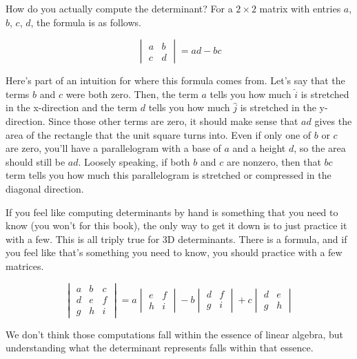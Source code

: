 How do you actually compute the determinant? For a $2 \times 2$ matrix with
entries $a$, $b$, $c$, $d$, the formula is as follows.

\begin{equation*}
  \begin{vmatrix}
    a & b \\
    c & d
  \end{vmatrix} = ad - bc
\end{equation*}

Here's part of an intuition for where this formula comes from. Let's say that the
terms $b$ and $c$ were both zero. Then, the term $a$ tells you how much
$\hat{i}$ is stretched in the x-direction and the term $d$ tells you how much
$\hat{j}$ is stretched in the y-direction. Since those other terms are zero, it
should make sense that $ad$ gives the area of the rectangle that the unit square
turns into. Even if only one of $b$ or $c$ are zero, you'll have a parallelogram
with a base of $a$ and a height $d$, so the area should still be $ad$. Loosely
speaking, if both $b$ and $c$ are nonzero, then that $bc$ term tells you how
much this parallelogram is stretched or compressed in the diagonal direction.

If you feel like computing determinants by hand is something that you need to
know (you won't for this book), the only way to get it down is to just practice
it with a few. This is all triply true for 3D determinants. There is a formula,
and if you feel like that's something you need to know, you should practice with
a few matrices.

\begin{equation*}
  \begin{vmatrix}
    a & b & c \\
    d & e & f \\
    g & h & i
  \end{vmatrix} =
  a \begin{vmatrix}
    e & f \\
    h & i
  \end{vmatrix}
  - b \begin{vmatrix}
    d & f \\
    g & i
  \end{vmatrix}
  + c \begin{vmatrix}
    d & e \\
    g & h
  \end{vmatrix}
\end{equation*}

We don't think those computations fall within the essence of linear algebra, but
understanding what the determinant represents falls within that essence.
